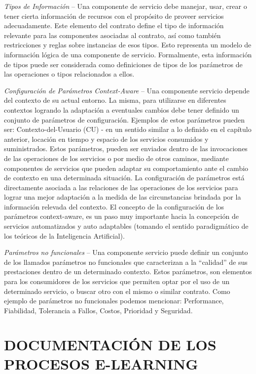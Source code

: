 \documentclass[12 pt,a4paper]{llncs}
\begin{document}
\textit{Tipos de Información} –  Una componente de servicio debe  manejar, usar,  crear o tener cierta información de recursos con el propósito de proveer servicios adecuadamente.  Este elemento del contrato define el tipo de información relevante para las componentes  asociadas al contrato, así como también restricciones y reglas sobre instancias de esos tipos. Esto representa un modelo de información lógica de una componente de servicio. Formalmente, esta información de tipos puede ser considerada como definiciones de tipos de  los parámetros de las operaciones o tipos relacionados a ellos.

\textit{Configuración de Parámetros Context-Aware} – Una componente servicio depende del contexto de su actual entorno. La misma, para utilizarse en diferentes contextos logrando la adaptación a eventuales cambios debe tener definido un conjunto de parámetros de configuración.  Ejemplos de estos parámetros pueden ser: Contexto-del-Usuario (CU) - en un sentido similar a lo definido en el capítulo anterior, locación en tiempo y espacio de los servicios consumidos y suministrados. Estos parámetros, pueden ser enviados dentro de las invocaciones de las operaciones de los servicios o por medio de otros caminos, mediante componentes de servicios que pueden adaptar su comportamiento ante el cambio de contexto en una determinada situación.  
La configuración de parámetros está directamente asociada a las relaciones de las operaciones de los servicios para lograr una mejor adaptación a la medida de las circunstancias brindada por la información relevada del contexto. El concepto de la configuración de los parámetros context-aware, es un paso muy importante hacia la concepción de servicios automatizados y auto adaptables (tomando el sentido paradigmático de los teóricos de la Inteligencia Artificial).

\textit{Parámetros no funcionales} – Una componente servicio puede definir un conjunto de  los llamados parámetros no funcionales que caracterizan a la “calidad” de sus prestaciones dentro de un determinado contexto. Estos parámetros, son elementos para los consumidores de los servicios que permiten optar por el uso de un determinado  servicio, o buscar otro con el mismo o similar contrato. Como ejemplo de parámetros no funcionales podemos mencionar: Performance, Fiabilidad, Tolerancia a Fallos, Costos, Prioridad y Seguridad.


\section{DOCUMENTACIÓN DE LOS PROCESOS E-LEARNING} \label{documentacion}
\end{document}
